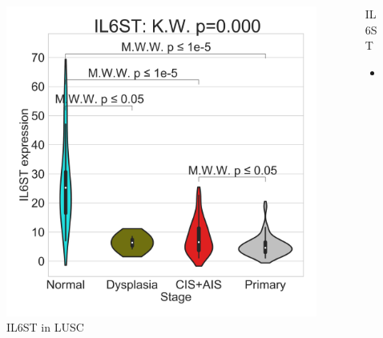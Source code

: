 \documentclass{beamer}
\begin{document}
\begin{frame}[allowframebreaks]
                    \begin{columns}
                        \begin{column}{0.4 \textwidth}
                            \begin{figure}
                                \includegraphics[width=\linewidth]{figures/DEG/Violin/STAR.TPM.SQC.violin/IL6ST.pdf}
                                \caption{IL6ST in LUSC}
                            \end{figure}
                        \end{column}
                        \begin{column}{0.55 \textwidth}
                            \begin{block}{IL6ST}
                                \begin{itemize}
                                    \item
                                \end{itemize}
                            \end{block}
                        \end{column}
                    \end{columns}


\end{frame}
\end{document}
